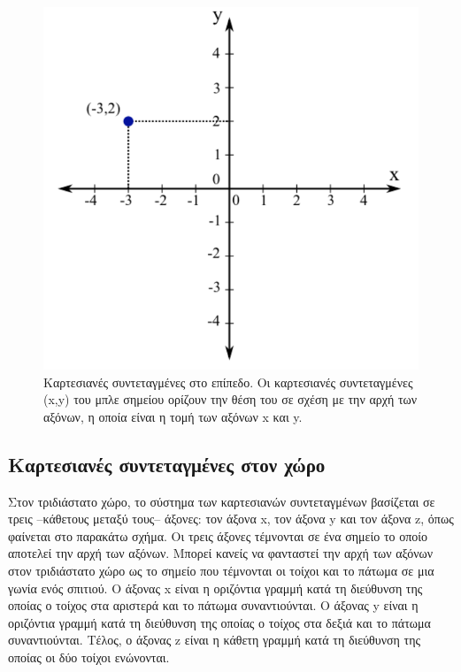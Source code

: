 \begin{figure}[h]
    \centering
    \includegraphics[scale=0.5]{Figures/appendixA_cartesian2D.png}
    \caption{Καρτεσιανές συντεταγμένες στο επίπεδο. Οι καρτεσιανές συντεταγμένες (x,y) του μπλε σημείου ορίζουν την θέση του σε σχέση με την αρχή των αξόνων, η οποία είναι η τομή των αξόνων x και y.}
    \label{fig:apxA_cartesian2D}
\end{figure}


\subsection{Καρτεσιανές συντεταγμένες στον χώρο}
Στον τριδιάστατο χώρο, το σύστημα των καρτεσιανών συντεταγμένων βασίζεται σε τρεις --κάθετους μεταξύ τους-- άξονες: τον άξονα x, τον άξονα y και τον άξονα z, όπως φαίνεται στο παρακάτω σχήμα. Οι τρεις άξονες τέμνονται σε ένα σημείο το οποίο αποτελεί την αρχή των αξόνων. Μπορεί κανείς να φανταστεί την αρχή των αξόνων στον τριδιάστατο χώρο ως το σημείο που τέμνονται οι τοίχοι και το πάτωμα σε μια γωνία ενός σπιτιού.
Ο άξονας x είναι η οριζόντια γραμμή κατά τη διεύθυνση της οποίας ο τοίχος στα αριστερά και το πάτωμα συναντιούνται. Ο άξονας y είναι η οριζόντια γραμμή κατά τη διεύθυνση της οποίας ο τοίχος στα δεξιά και το πάτωμα συναντιούνται. Τέλος, ο άξονας z είναι η κάθετη γραμμή κατά τη διεύθυνση της οποίας οι δύο τοίχοι ενώνονται.


